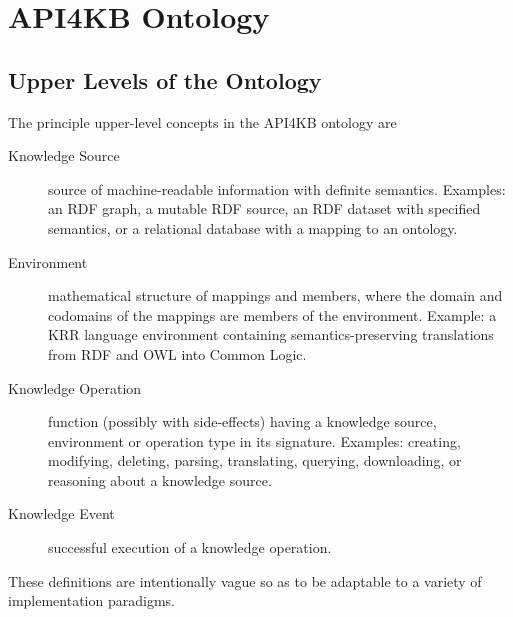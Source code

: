 \documentclass[runningheads]{llncs}
\begin{document}
\section{API4KB Ontology}
\label{sec:ontology}
\subsection{Upper Levels of the Ontology}
\label{sec:upper}
The principle upper-level concepts in the API4KB ontology are
\begin{description}
\item[Knowledge Source] source of machine-readable information with definite semantics. Examples: an RDF graph, a mutable RDF source, an RDF dataset with specified semantics, or a relational database with a mapping to an ontology.
\item[Environment] mathematical structure of mappings and members, where the domain and codomains of the mappings are members of the environment.  Example: a KRR language environment containing semantics-preserving translations from RDF and OWL into Common Logic.
\item[Knowledge Operation] function (possibly with side-effects) having a knowledge source, environment or operation type in its signature. Examples: creating, modifying, deleting, parsing, translating, querying, downloading, or reasoning about a knowledge source.
\item[Knowledge Event] successful execution of a knowledge operation.
\end{description}
These definitions are intentionally vague so as to be adaptable to a variety of implementation paradigms.
\end{document}
